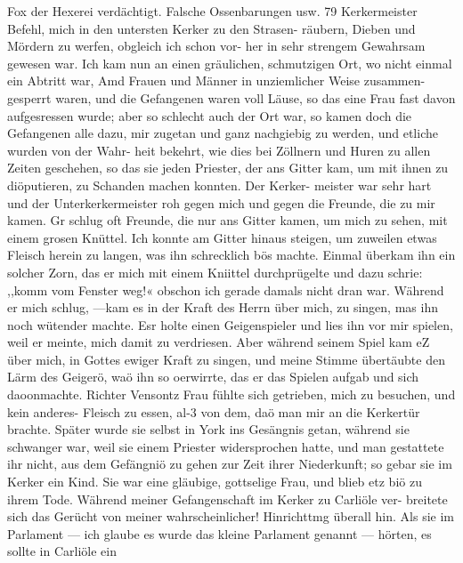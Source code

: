 Fox der Hexerei verdächtigt. Falsche Ossenbarungen usw. 79
Kerkermeister Befehl, mich in den untersten Kerker zu den Strasen-
räubern, Dieben und Mördern zu werfen, obgleich ich schon vor-
her in sehr strengem Gewahrsam gewesen war. Ich kam nun
an einen gräulichen, schmutzigen Ort, wo nicht einmal ein Abtritt
war, Amd Frauen und Männer in unziemlicher Weise zusammen-
gesperrt waren, und die Gefangenen waren voll Läuse, so das eine
Frau fast davon aufgesressen wurde; aber so schlecht auch der
Ort war, so kamen doch die Gefangenen alle dazu, mir zugetan
und ganz nachgiebig zu werden, und etliche wurden von der Wahr-
heit bekehrt, wie dies bei Zöllnern und Huren zu allen Zeiten
geschehen, so das sie jeden Priester, der ans Gitter kam, um mit
ihnen zu diöputieren, zu Schanden machen konnten. Der Kerker-
meister war sehr hart und der Unterkerkermeister roh gegen mich und
gegen die Freunde, die zu mir kamen. Gr schlug oft Freunde,
die nur ans Gitter kamen, um mich zu sehen, mit einem grosen
Knüttel. Ich konnte am Gitter hinaus steigen, um zuweilen etwas
Fleisch herein zu langen, was ihn schrecklich bös machte. Einmal
überkam ihn ein solcher Zorn, das er mich mit einem Kniittel
durchprügelte und dazu schrie: ,,komm vom Fenster weg!« obschon
ich gerade damals nicht dran war. Während er mich schlug,
—kam es in der Kraft des Herrn über mich, zu singen, mas ihn
noch wütender machte. Esr holte einen Geigenspieler und lies
ihn vor mir spielen, weil er meinte, mich damit zu verdriesen.
Aber während seinem Spiel kam eZ über mich, in Gottes ewiger
Kraft zu singen, und meine Stimme übertäubte den Lärm des
Geigerö, waö ihn so oerwirrte, das er das Spielen aufgab und
sich daoonmachte.
Richter Vensontz Frau fühlte sich getrieben, mich zu besuchen,
und kein anderes- Fleisch zu essen, al-3 von dem, daö man mir
an die Kerkertür brachte. Später wurde sie selbst in York ins
Gesängnis getan, während sie schwanger war, weil sie einem
Priester widersprochen hatte, und man gestattete ihr nicht, aus
dem Gefängniö zu gehen zur Zeit ihrer Niederkunft; so gebar
sie im Kerker ein Kind. Sie war eine gläubige, gottselige Frau,
und blieb etz biö zu ihrem Tode.
Während meiner Gefangenschaft im Kerker zu Carliöle ver-
breitete sich das Gerücht von meiner wahrscheinlicher! Hinrichttmg
überall hin. Als sie im Parlament — ich glaube es wurde das
kleine Parlament genannt — hörten, es sollte in Carliöle ein


